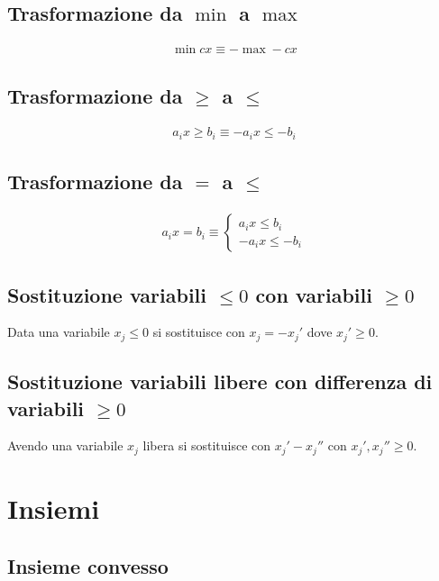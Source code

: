 \subsection{Trasformazione da $\min$ a $\max$}

\begin{align}
	\min cx \equiv - \max -cx
\end{align}

\subsection{Trasformazione da $\geq$ a $\leq$}

\begin{align}
	a_i x \geq b_i \equiv -a_i x \leq -b_i
\end{align}

\subsection{Trasformazione da $=$ a $\leq$}

\begin{align}
	a_i x = b_i \equiv \begin{cases}
		                   a_i x \leq b_i \\
		                   -a_i x \leq -b_i
	                   \end{cases}
\end{align}


\subsection{Sostituzione variabili $\leq 0$ con variabili $\geq 0$}

Data una variabile $x_j \leq 0$ si sostituisce con $x_j = -x_j'$ dove $x_j' \geq 0$.


\subsection{Sostituzione variabili libere con differenza di variabili $\geq 0$}

Avendo una variabile $x_j$ libera si sostituisce con $x_j' - x_j''$ con $x_j', x_j'' \geq 0$.


\section{Insiemi}
\subsection{Insieme convesso}

